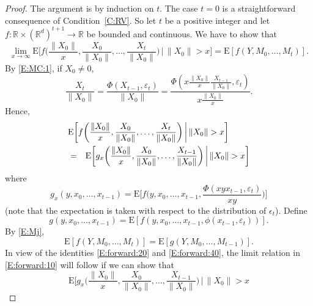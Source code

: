 \documentclass{aptpubarxiv}
\numberwithin{equation}{section}
\begin{document}
\begin{proof}
The argument is by induction on $t$. The case $t = 0$ is a straightforward consequence of Condition~\ref{C:RV}. So let $t$ be a positive integer and let $f : {\mathbb{R}}\times({\mathbb{R}}^d)^{t+1} \to {\mathbb{R}}$ be bounded and continuous. We have to show that
\begin{equation}
\label{E:forward:10}
	\lim_{x \to \infty}
	{\mathrm{E}} \biggl[
	f \biggl( \frac{\|X_0\|}{x}, \frac{X_0}{\|X_0\|}, \ldots, \frac{X_t}{\|X_0\|} \biggr)
	\, \biggl| \, \|X_0\| > x
	\biggr]
	= {\mathrm{E}} [ f(Y, M_0, \ldots, M_t) ].
\end{equation}
By \eqref{E:MC:1}, if $X_0 \neq 0$,
\[
	\frac{X_t}{\|X_0\|}
	= \frac{\Phi(X_{t-1}, {\varepsilon}_t)}{\|X_0\|}
	= \frac{\Phi(x \frac{\|X_0\|}{x} \frac{X_{t-1}}{\|X_0\|}, {\varepsilon}_t)}
	{x \frac{\|X_0\|}{x}}.
\]
Hence,
\begin{eqnarray}
\label{E:forward:20}
	\lefteqn{
	{\mathrm{E}} \biggl[
	f \biggl( \frac{\|X_0\|}{x}, \frac{X_0}{\|X_0\|}, \ldots, \frac{X_t}{\|X_0\|} \biggr)
	\, \biggl| \, \|X_0\| > x
	\biggr]
	} \\
	&=&
	{\mathrm{E}} \biggl[
	g_x \biggl( \frac{\|X_0\|}{x}, \frac{X_0}{\|X_0\|}, \ldots, \frac{X_{t-1}}{\|X_0\|} \biggr)
	\, \biggl| \, \|X_0\| > x
	\biggr] 
	\nonumber
\end{eqnarray}
where
\begin{equation}
\label{E:forward:gx}
	g_x(y, x_0, \ldots, x_{t-1})
	= {\mathrm{E}} \biggl[ f \biggl( y, x_0, \ldots, x_{t-1}, \frac{\Phi(xyx_{t-1}, {\varepsilon}_t)}{xy} \biggr) 
	\biggr]
\end{equation}
(note that the expectation is taken with respect to the distribution of $\epsilon_t$).
Define
\begin{equation}
\label{E:forward:g}
	g(y, x_0, \ldots, x_{t-1})
	= {\mathrm{E}} [ f (y, x_0, \ldots, x_{t-1}, \phi(x_{t-1},{\varepsilon}_t) ) ].
\end{equation}
By \eqref{E:Mj},
\begin{equation}
\label{E:forward:40}
	{\mathrm{E}} [ f(Y, M_0, \ldots, M_t) ] = {\mathrm{E}} [ g(Y, M_0, \ldots, M_{t-1}) ].
\end{equation}
In view of the identities \eqref{E:forward:20} and \eqref{E:forward:40}, the limit relation in \eqref{E:forward:10} will follow if we can show that
\begin{equation}
\label{E:forward:50}
	{\mathrm{E}} \biggl[
	g_x \biggl( \frac{\|X_0\|}{x}, \frac{X_0}{\|X_0\|}, \ldots, \frac{X_{t-1}}{\|X_0\|} \biggr)
	\, \biggl| \, \|X_0\| > x

\end{equation}
\end{proof}
\end{document}
